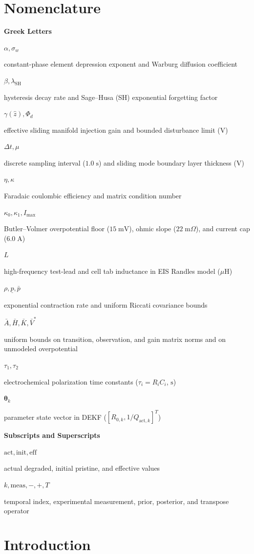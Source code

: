 \documentclass[11pt,a4paper]{article}
\newcommand{\entry}[2]{\noindent\parbox[t]{0.26\textwidth}{\raggedright #1}\parbox[t]{0.72\textwidth}{#2}\par\vspace{4pt}}
\newcommand{\EntryHeading}[1]{\par\vspace{10pt}\noindent\textbf{\large #1}\par\vspace{4pt}}
\newenvironment{nomenclature}{\section*{Nomenclature}\vspace{0.5em}}{\vspace{1em}}
\begin{document}
\begin{nomenclature}
\EntryHeading{Greek Letters}
\entry{$\alpha, \sigma_w$}{constant-phase element depression exponent and Warburg diffusion coefficient}
\entry{$\beta, \lambda_{\text{SH}}$}{hysteresis decay rate and Sage--Husa (SH) exponential forgetting factor}
\entry{$\gamma(\hat{z}), \Phi_d$}{effective sliding manifold injection gain and bounded disturbance limit ($\text{V}$)}
\entry{$\Delta t, \mu$}{discrete sampling interval ($1.0\;\text{s}$) and sliding mode boundary layer thickness ($\text{V}$)}
\entry{$\eta, \kappa$}{Faradaic coulombic efficiency and matrix condition number}
\entry{$\kappa_0, \kappa_1, I_{\max}$}{Butler--Volmer overpotential floor ($15\;\mathrm{mV}$), ohmic slope ($22\;\mathrm{m}\Omega$), and current cap ($6.0\;\mathrm{A}$)}
\entry{$L$}{high-frequency test-lead and cell tab inductance in EIS Randles model ($\mu\text{H}$)}
\entry{$\rho, \underline{p}, \bar{p}$}{exponential contraction rate and uniform Riccati covariance bounds}
\entry{$\bar{A}, \bar{H}, \bar{K}, \bar{V}^*$}{uniform bounds on transition, observation, and gain matrix norms and on unmodeled overpotential}
\entry{$\tau_1, \tau_2$}{electrochemical polarization time constants ($\tau_i = R_i C_i$, $\text{s}$)}
\entry{$\boldsymbol{\theta}_k$}{parameter state vector in DEKF ($[R_{0,k}, 1/Q_{\text{act},k}]^T$)}

\EntryHeading{Subscripts and Superscripts}
\entry{$\text{act}, \text{init}, \text{eff}$}{actual degraded, initial pristine, and effective values}
\entry{$k, \text{meas}, -, +, T$}{temporal index, experimental measurement, prior, posterior, and transpose operator}
\end{nomenclature}

\section{Introduction}
\end{document}
